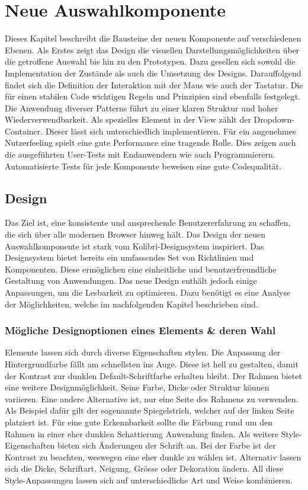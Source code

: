 \chapter{Neue Auswahlkomponente}
\label{chap:newComponent}

Dieses Kapitel beschreibt die Bausteine der neuen Komponente auf verschiedenen Ebenen. 
Als Erstes zeigt das Design die visuellen Darstellungsmöglichkeiten über die getroffene Auswahl bis hin zu den Prototypen. 
Dazu gesellen sich sowohl die Implementation der Zustände als auch die Umsetzung des Designs.
Darauffolgend findet sich die Definition der Interaktion mit der Maus wie auch der Tastatur. 
Die für einen stabilen Code wichtigen Regeln und Prinzipien sind ebenfalls festgelegt. 
Die Anwendung diverser Patterns führt zu einer klaren Struktur und hoher Wiederverwendbarkeit. 
Als spezielles Element in der View zählt der Dropdown-Container. 
Dieser lässt sich unterschiedlich implementieren. 
Für ein angenehmes Nutzerfeeling spielt eine gute Performance eine tragende Rolle. 
Dies zeigen auch die ausgeführten User-Tests mit Endanwendern wie auch Programmierern. 
Automatisierte Tests für jede Komponente beweisen eine gute Codequalität. 


\section{Design}
\label{sec:design}

Das Ziel ist, eine konsistente und ansprechende Benutzererfahrung zu schaffen, die sich über alle modernen Browser hinweg hält. 
Das Design der neuen Auswahlkomponente ist stark vom Kolibri-Designsystem inspiriert. 
Das Designsystem bietet bereits ein umfassendes Set von Richtlinien und Komponenten. 
Diese ermöglichen eine einheitliche und benutzerfreundliche Gestaltung von Anwendungen. 
Das neue Design enthält jedoch einige Anpassungen, um die Lesbarkeit zu optimieren. 
Dazu benötigt es eine Analyse der Möglichkeiten, welche im nachfolgenden Kapitel beschrieben sind. 


\subsection{Mögliche Designoptionen eines Elements \& deren Wahl}
\label{sec:possibleDesignOptions}

Elemente lassen sich durch diverse Eigenschaften stylen. 
Die Anpassung der Hintergrundfarbe fällt am schnellsten ins Auge. 
Diese ist hell zu gestalten, damit der Kontrast zur dunklen Default-Schriftfarbe erhalten bleibt. 
Der Rahmen bietet eine weitere Designmöglichkeit. 
Seine Farbe, Dicke oder Struktur können variieren. 
Eine andere Alternative ist, nur eine Seite des Rahmens zu verwenden. 
Als Beispiel dafür gilt der sogenannte Spiegelstrich, welcher auf der linken Seite platziert ist. 
Für eine gute Erkennbarkeit sollte die Färbung rund um den Rahmen in einer eher dunklen Schattierung Anwendung finden. 
Als weitere Style-Eigenschaften bieten sich Änderungen der Schrift an. 
Bei der Farbe ist der Kontrast zu beachten, weswegen eine eher dunkle zu wählen ist. 
Alternativ lassen sich die Dicke, Schriftart, Neigung, Grösse oder Dekoration ändern. 
All diese Style-Anpassungen lassen sich auf unterschiedliche Art und Weise kombinieren. 

